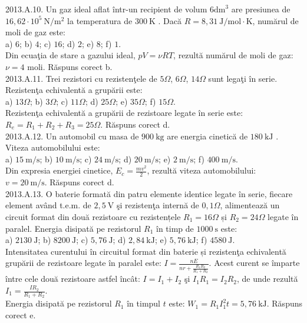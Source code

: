 2013.A.10. Un gaz ideal aflat într-un recipient de volum $6 \mathrm{dm}^{3}$ are presiunea de $16,62 \cdot 10^{5} \mathrm{~N} / \mathrm{m}^{2}$ la temperatura de $300 \mathrm{~K}$ . Dacă $R=8,31 \mathrm{~J} / \mathrm{mol} \cdot \mathrm{K}$, numărul de moli de gaz este:\\ a) $6$; b) $4$; c) $16$; d) $2$; e) $8$; f) $1$.\\ Din ecuaţia de stare a gazului ideal, $p V=\nu R T$, rezultă numărul de moli de gaz: $\nu=4$ moli. Răspuns corect b.\\

2013.A.11. Trei rezistori cu rezistenţele de $5 \Omega$, $6 \Omega$, $14 \Omega$ sunt legaţi în serie. Rezistenţa echivalentă a grupării este:\\ a) $13 \Omega$; b) $3 \Omega$; c) $11 \Omega$; d) $25 \Omega$; e) $35 \Omega$; f) $15 \Omega$.\\ Rezistenţa echivalentă a grupării de rezistoare legate în serie este:\\ $R_{e}=R_{1}+R_{2}+R_{3}=25 \Omega$. Răspuns corect d.\\

2013.A.12. Un automobil cu masa de $900 \mathrm{~kg}$ are energia cinetică de $180 \mathrm{~kJ}$ . Viteza automobilului este:\\ a) $15 \mathrm{~m} / \mathrm{s}$; b) $10 \mathrm{~m} / \mathrm{s}$; c) $24 \mathrm{~m} / \mathrm{s}$; d) $20 \mathrm{~m} / \mathrm{s}$; e) $2 \mathrm{~m} / \mathrm{s}$; f) $400 \mathrm{~m} / \mathrm{s}$.\\ Din expresia energiei cinetice, $E_{c}=\frac{m v^{2}}{2}$, rezultă viteza automobilului:\\ $v=20 \mathrm{~m} / \mathrm{s}$. Răspuns corect d.\\

2013.A.13. O baterie formată din patru elemente identice legate în serie, fiecare element având t.e.m. de $2,5 \mathrm{~V}$ şi rezistenţa internă de $0,1 \Omega$, alimentează un circuit format din două rezistoare cu rezistențele $R_{1}=16 \Omega$ și $R_{2}=24 \Omega$ legate în paralel. Energia disipată pe rezistorul $R_{1}$ în timp de $1000 \mathrm{~s}$ este:\\ a) $2130 \mathrm{~J}$; b) $8200 \mathrm{~J}$; c) $5,76 \mathrm{~J}$; d) $2,84 \mathrm{~kJ}$; e) $5,76 \mathrm{~kJ}$; f) $4580 \mathrm{~J}$.\\ Intensitatea curentului în circuitul format din baterie și rezistenţa echivalentă grupării de rezistoare legate în paralel este: $I=\frac{n E}{n r+\frac{R_{1} R_{2}}{R_{1}+R_{2}}}$. Acest curent se împarte între cele două rezistoare astfel încât: $I=I_{1}+I_{2}$ şi $I_{1} R_{1}=I_{2} R_{2}$, de unde rezultă $I_{1}=\frac{I R_{2}}{R_{1}+R_{2}}$.\\ Energia disipată pe rezistorul $R_{1}$ în timpul $t$ este: $W_{1}=R_{1} I_{1}^{2} t=5,76 \mathrm{~kJ}$. Răspuns corect e.\\

